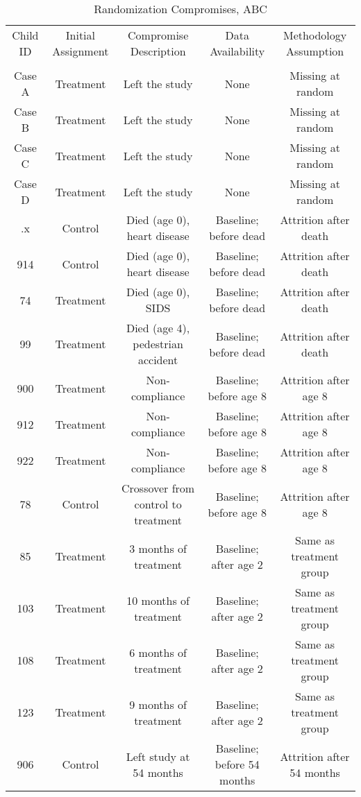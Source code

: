 \begin{sidewaystable}[H] 
\begin{threeparttable}
\caption{Randomization Compromises, ABC}
\label{table:abccompromises}
\centering
\footnotesize
\begin{tabular}{ccccc} \toprule
Child ID & Initial Assignment & Compromise Description & Data Availability & Methodology Assumption \\ \\ \midrule
Case A & Treatment & Left the study & None & Missing at random \\
Case B & Treatment & Left the study & None & Missing at random \\
Case C & Treatment & Left the study & None & Missing at random \\
Case D & Treatment & Left the study & None & Missing at random \\ \midrule
.x    & Control  & Died (age 0), heart disease & Baseline; before dead & Attrition after death \\
914 & Control  & Died (age 0), heart disease & Baseline; before dead & Attrition after death \\
74 & Treatment & Died (age 0), SIDS & Baseline; before dead & Attrition after death \\
99 & Treatment  & Died (age 4), pedestrian accident & Baseline; before dead & Attrition after death \\ \midrule
900 & Treatment  & Non-compliance  & Baseline; before age 8 & Attrition after age 8  \\
912 & Treatment  & Non-compliance  & Baseline; before age 8 & Attrition after age 8  \\
922 & Treatment  & Non-compliance  & Baseline; before age 8 & Attrition after age 8  \\ \midrule
78  & Control        & Crossover from control to treatment & Baseline; before age 8 & Attrition after age 8  \\ \midrule
85 & Treatment   & 3 months of treatment &  Baseline; after age 2 & Same as treatment group  \\  
103 & Treatment &10 months of treatment &  Baseline; after age 2 & Same as treatment group  \\
108 & Treatment & 6 months of treatment &  Baseline; after age 2 & Same as treatment group  \\ 
123 & Treatment & 9 months of treatment &  Baseline; after age 2 & Same as treatment group  \\  \midrule
906 & Control  & Left study at 54 months & Baseline; before 54 months & Attrition after 54 months \\ \midrule

\end{tabular}
\end{threeparttable}
\end{sidewaystable}
